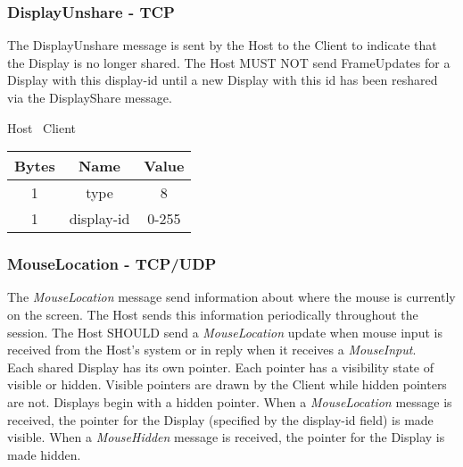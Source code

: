\subsubsection{DisplayUnshare - TCP}

The DisplayUnshare message is sent by the Host to the Client to indicate that the Display is no longer shared.
The Host MUST NOT send FrameUpdates for a Display with this display-id until a new Display with this id has been
reshared via the DisplayShare message.

\begin{center}
    Host \textrightarrow\ Client\\
    \begin{tabular}{|c|c|c|}
        \hline
        \textbf{Bytes} & \textbf{Name} & \textbf{Value} \\
        \hline
        1              & type          & 8              \\
        \hline
        1              & display-id    & 0-255          \\
        \hline
    \end{tabular}
\end{center}

\subsubsection{MouseLocation - TCP/UDP}

The \emph{MouseLocation} message send information about where the mouse is currently on the screen.
The Host sends this information periodically throughout the session.
The Host SHOULD send a \emph{MouseLocation} update when mouse input is received from the Host's system or in
reply when it receives a \emph{MouseInput}.\\

Each shared Display has its own pointer.
Each pointer has a visibility state of visible or hidden.
Visible pointers are drawn by the Client while hidden pointers are not.
Displays begin with a hidden pointer.
When a \emph{MouseLocation} message is received, the pointer for the Display (specified by the display-id field) is made visible.
When a \emph{MouseHidden} message is received, the pointer for the Display is made hidden.

